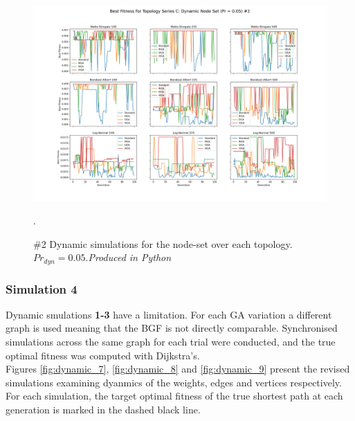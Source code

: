 \documentclass[
	a4paper, %
	10pt, %
	unnumberedsections, %
	twoside, %
]{LTJournalArticle}
\begin{document}
\begin{figure}
	\includegraphics[width=\linewidth]{Figures/sims/dynamic/series_c_node_2.jpg}
	\caption{\#2 Dynamic simulations for the node-set over each topology. \(Pr_{dyn} = 0.05\).\emph{Produced in Python}}. 
	\label{fig:dynamic_6}
\end{figure}

\subsubsection{Simulation 4} Dynamic smulations \textbf{1-3} have a limitation. For each GA variation a different graph is used meaning that the BGF is not directly comparable. Synchronised simulations across the same graph for each trial were conducted, and the true optimal fitness was computed with Dijkstra's.
\\

Figures \ref{fig:dynamic_7}, \ref{fig:dynamic_8} and \ref{fig:dynamic_9} present the revised simulations examining dyanmics of the weights, edges and vertices respectively. For each simulation, the target optimal fitness of the true shortest path at each generation is marked in the dashed black line. \\
\end{document}
